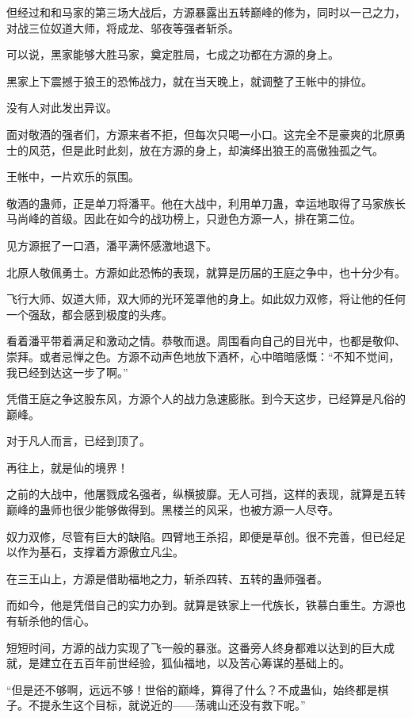 \begin{this_body}
但经过和和马家的第三场大战后，方源暴露出五转巅峰的修为，同时以一己之力，对战三位奴道大师，将成龙、邬夜等强者斩杀。

可以说，黑家能够大胜马家，奠定胜局，七成之功都在方源的身上。

黑家上下震撼于狼王的恐怖战力，就在当天晚上，就调整了王帐中的排位。

没有人对此发出异议。

面对敬酒的强者们，方源来者不拒，但每次只喝一小口。这完全不是豪爽的北原勇士的风范，但是此时此刻，放在方源的身上，却演绎出狼王的高傲独孤之气。

王帐中，一片欢乐的氛围。

敬酒的蛊师，正是单刀将潘平。他在大战中，利用单刀蛊，幸运地取得了马家族长马尚峰的首级。因此在如今的战功榜上，只逊色方源一人，排在第二位。

见方源抿了一口酒，潘平满怀感激地退下。

北原人敬佩勇士。方源如此恐怖的表现，就算是历届的王庭之争中，也十分少有。

飞行大师、奴道大师，双大师的光环笼罩他的身上。如此奴力双修，将让他的任何一个强敌，都会感到极度的头疼。

看着潘平带着满足和激动之情。恭敬而退。周围看向自己的目光中，也都是敬仰、崇拜。或者忌惮之色。方源不动声色地放下酒杯，心中暗暗感慨：“不知不觉间，我已经到达这一步了啊。”

凭借王庭之争这股东风，方源个人的战力急速膨胀。到今天这步，已经算是凡俗的巅峰。

对于凡人而言，已经到顶了。

再往上，就是仙的境界！

之前的大战中，他屠戮成名强者，纵横披靡。无人可挡，这样的表现，就算是五转巅峰的蛊师也很少能够做得到。黑楼兰的风采，也被方源一人尽夺。

奴力双修，尽管有巨大的缺陷。四臂地王杀招，即便是草创。很不完善，但已经足以作为基石，支撑着方源傲立凡尘。

在三王山上，方源是借助福地之力，斩杀四转、五转的蛊师强者。

而如今，他是凭借自己的实力办到。就算是铁家上一代族长，铁慕白重生。方源也有斩杀他的信心。

短短时间，方源的战力实现了飞一般的暴涨。这番旁人终身都难以达到的巨大成就，是建立在五百年前世经验，狐仙福地，以及苦心筹谋的基础上的。

“但是还不够啊，远远不够！世俗的巅峰，算得了什么？不成蛊仙，始终都是棋子。不提永生这个目标，就说近的——荡魂山还没有救下呢。”


\end{this_body}
